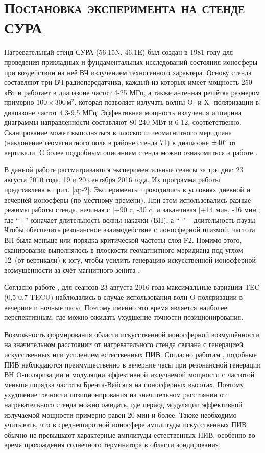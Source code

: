 \section{\textsc{Постановка эксперимента на стенде СУРА}}

Нагревательный стенд СУРА (56,15\degree N, 46,1\degree E) был создан в 1981 году для проведения прикладных и фундаментальных исследований состояния ионосферы при воздействии на неё ВЧ излучением техногенного характера.  
Основу стенда составляют три ВЧ радиопередатчика, каждый из которых имеет мощность 250 кВт и работает в диапазоне частот 4-25 МГц, а также антенная решётка размером примерно $100\times300\,\text{м}^2$, которая позволяет излучать волны O- и X- поляризации в диапазоне частот 4,3-9,5 МГц. 
Эффективная мощность излучения и ширина диаграммы направленности составляют 80-240 МВт и 6-12\degree, соответственно.  
Сканирование может выполняться в плоскости геомагнитного меридиана (наклонение геомагнитного поля в районе стенда 71\degree) в диапазоне $\pm40\degree$ от вертикали.     
С более подробным описанием стенда можно ознакомиться в работе \cite{Belikovich2007}.

В данной работе рассматриваются экспериментальные сеансы за три дня: 23 августа 2010 года, 19 и 20 сентября 2016 года. 
Их программа работы представлена в прил. \ref{ap-2}.
Эксперименты проводились в условиях дневной и вечерней ионосферы (по местному времени).
При этом использовались разные режимы работы стенда, начиная с [+90 c, -30 c] и заканчивая [+14 мин, -16 мин], где ``+'' означает длительность волны накачки (ВН), а ``-'' -- длительность паузы.  
Чтобы обеспечить резонансное взаимодействие с ионосферной плазмой, частота ВН была меньше или порядка критической частоты слоя F2. 
Помимо этого, сканирование выполнялось в плоскости геомагнитного меридиана под углом 12\degree~(от вертикали) к югу, чтобы усилить генерацию искусственной ионосферной возмущённости за счёт магнитного зенита \cite{Streltsov2018, Tereshchenko2004}.

Согласно работе \cite{Kunitsyn2012}, для сеансов 23 августа 2016 года максимальные вариации TEC (0,5-0,7 TECU) наблюдались в случае использования волн O-поляризации в вечерние и ночные часы.
Поэтому именно это время является наиболее перспективным, где можно ожидать ухудшение точности позиционирования. 

Возможность формирования области искусственной ионосферной возмущённости на значительном расстоянии от нагревательного стенда связана с генерацией искусственных или усилением естественных ПИВ.
Согласно работам \cite{Chernogor2011, Chernogor2013, Kunitsyn2012}, подобные ПИВ наблюдаются преимущественно в вечерние часы при резонансной генерации ВН O-поляризации и модуляции эффективной излучаемой мощности с частотой меньше порядка частоты Брента-Вяйсяля на ионосферных высотах. 
Поэтому ухудшение точности позиционирования на значительном расстоянии от нагревательного стенда можно ожидать, где период модуляции эффективной излучаемой мощности примерно равен 20 мин и более.
Также необходимо учитывать, что в среднеширотной ионосфере амплитуды искусственных ПИВ обычно не превышают характерные амплитуды естественных ПИВ, особенно во время прохождения солнечного терминатора в области зондирования.

